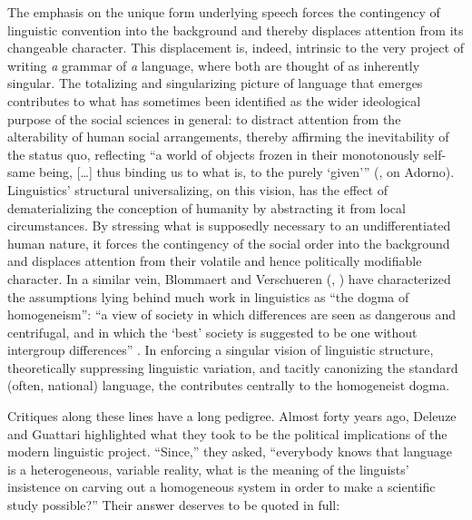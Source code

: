 \documentclass[output=paper]{langscibook}
\begin{document}
The  emphasis on the unique form underlying speech forces the contingency of linguistic convention into the background and thereby displaces attention from its changeable character. This displacement is, indeed, intrinsic to the very project of writing \emph{a} grammar of \emph{a} language, where both are thought of as inherently singular. The totalizing and singularizing picture of language that emerges contributes to what has sometimes been identified as the wider ideological purpose of the social sciences in general: to distract attention from the alterability of human social arrangements, thereby affirming the inevitability of the status quo, reflecting ``a world of objects frozen in their monotonously self-same being, […] thus binding us to what is, to the purely `given'\thinspace'' (\citealt[126]{Eagleton1991}, on Adorno). Linguistics' structural universalizing, on this vision, has the effect of dematerializing the conception of humanity by abstracting it from local circumstances. By stressing what is supposedly necessary to an undifferentiated human nature, it forces the contingency of the social order into the background and displaces attention from their volatile and hence politically modifiable character. In a similar vein, Blommaert and Verschueren (\citeyear{BlommaertVerschueren1991}, \citeyear{BlommaertVerschueren1992}) have characterized the assumptions lying behind much work in linguistics as ``the dogma of homogeneism'': ``a view of society in which differences are seen as dangerous and centrifugal, and in which the `best' society is suggested to be one without intergroup differences'' \citep[362]{BlommaertVerschueren1992}. In enforcing a singular vision of linguistic structure, theoretically suppressing linguistic variation, and tacitly canonizing the standard (often, national) language, the  contributes centrally to the homogeneist dogma.

Critiques along these lines have a long pedigree. Almost forty years ago, Deleuze and Guattari highlighted what they took to be the political implications of the modern linguistic project. ``Since,'' they asked, ``everybody knows that language is a heterogeneous, variable reality, what is the meaning of the linguists' insistence on carving out a homogeneous system in order to make a scientific study possible?'' Their answer deserves to be quoted in full:
\end{document}
